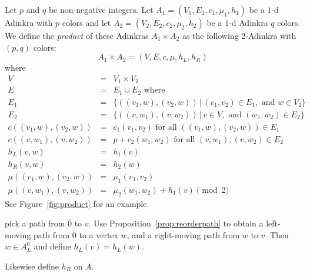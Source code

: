 \begin{construction}
\label{const:product}
Let $p$ and $q$ be non-negative integers.  Let $A_1=(V_1, E_1, c_1, \mu_1,h_1)$ be a $1$-d Adinkra with $p$ colors and let $A_2=(V_2, E_2, c_2, \mu_2,h_2)$ be a $1$-d Adinkra $q$ colors.  We define the \emph{product} of these Adinkras $A_1\times A_2$ as the following 2-Adinkra with $(p,q)$ colors:
\[A_1\times A_2=(V,E,c,\mu,h_L,h_R)\]
where
\begin{eqnarray*}
V&=&V_1\times V_2\\
E&=&E_1\cup E_2\mbox{ where}\\
E_1&=&\{((v_1,w),(v_2,w))\,|\,(v_1, v_2)\in E_1,\mbox{ and } w\in V_2\}\\
E_2&=&\{((v,w_1),(v,w_2))\,|\,v\in V, \mbox{ and }(w_1,w_2)\in E_2\}\\
c((v_1,w),(v_2,w))&=&c_1(v_1,v_2)\mbox{ for all $((v_1,w),(v_2,w))\in E_1$}\\
c((v,w_1),(v,w_2))&=&p+c_2(w_1,w_2)\mbox{ for all $(v,w_1),(v,w_2)\in E_2$}\\
h_L(v,w)&=&h_1(v)\\
h_R(v,w)&=&h_2(w)\\
\mu((v_1,w),(v_2,w))&=&\mu_1(v_1,v_2)\\
\mu((v,w_1),(v,w_2))&=&\mu_2(w_1,w_2)+h_1(v)\pmod{2}
\end{eqnarray*}
See Figure~\ref{fig:product} for an example.
\end{construction}



pick a path from $\overline{0}$ to $v$.  Use Proposition~\ref{prop:reorderpath} to obtain a left-moving path from $\overline{0}$ to a vertex $w$, and a right-moving path from $w$ to $v$.  Then $w\in A_L^0$ and define $h_L(v)=h_L(w)$.

Likewise define $h_R$ on $A$.

